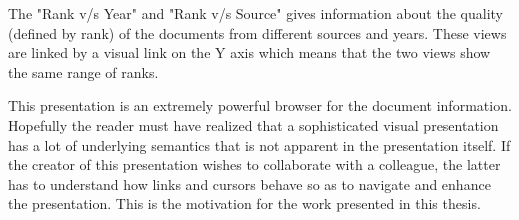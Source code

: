 The "Rank v/s Year" and "Rank v/s Source" gives information about the 
quality (defined by rank) of the documents from different sources and years.
These views are linked by a visual link on the Y axis which means that
the two views show the same range of ranks. 

This presentation is an extremely powerful browser for the document 
information. Hopefully the reader must have realized that a sophisticated
visual presentation has a lot of underlying semantics that is not apparent in
the presentation itself. If the creator of this presentation wishes to
collaborate with a colleague, the latter has to understand how links and
cursors behave so as to navigate and enhance the presentation. This is the
motivation for the work presented in this thesis.  
















